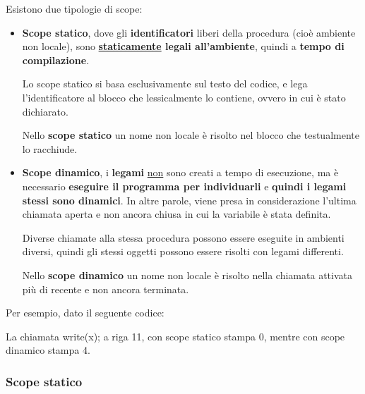 \documentclass[a4paper]{article}
\begin{document}
 	Esistono due tipologie di scope:
 	\begin{itemize}\label{scope statico e dinamico}
 		\item \textbf{Scope statico}, dove gli \textbf{identificatori} liberi della procedura (cioè ambiente non locale), sono \textbf{\underline{staticamente} legali all'ambiente}, quindi a \textbf{tempo di compilazione}.
 		
 		Lo scope statico si basa esclusivamente sul testo del codice, e lega l'identificatore al blocco che lessicalmente lo contiene, ovvero in cui è stato dichiarato.
 		
 		\begin{boxdef}
 			Nello \textcolor{Red3}{\textbf{scope statico}} un nome non locale è risolto nel blocco che testualmente lo racchiude.
 		\end{boxdef}
 		
 		\item \textbf{Scope dinamico}, i \textbf{legami} \underline{non} sono creati a tempo di esecuzione, ma è necessario \textbf{eseguire il programma per individuarli} e \textbf{quindi i legami stessi sono dinamici}. In altre parole, viene presa in considerazione l'ultima chiamata aperta e non ancora chiusa in cui la variabile è stata definita.
 		
 		Diverse chiamate alla stessa procedura possono essere eseguite in ambienti diversi, quindi gli stessi oggetti possono essere risolti con legami differenti.
 		
 		\begin{boxdef}
 			Nello \textcolor{Red3}{\textbf{scope dinamico}} un nome non locale è risolto nella chiamata attivata più di recente e non ancora terminata.
 		\end{boxdef}
 	\end{itemize}
 	Per esempio, dato il seguente codice:
 	
 	La chiamata \textsf{write(x);} a riga 11, con scope statico stampa 0, mentre con scope dinamico stampa 4.\newpage
 	
 	\subsubsection{Scope statico}
 	
\end{document}
